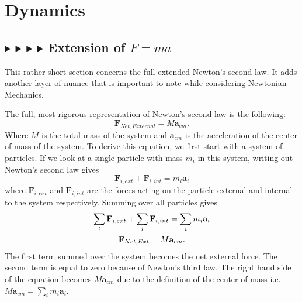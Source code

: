 \clearpage

%
%
%
%

\section{Dynamics}\label{1.2}

%
%
\subsection{\color{OrangeRed} $\blacktriangleright$ \color{PineGreen} $\blacktriangleright$ \color{Goldenrod} $\blacktriangleright$ \color{Orchid} $\blacktriangleright$ \color{black} Extension of $F=ma$}\label{1.2.1}
This rather short section concerns the full extended Newton's second law. It adds another layer of nuance that is important to note while considering Newtonian Mechanics.

\noindent The full, most rigorous representation of Newton's second law is the following:
\begin{equation}
    \boxed{\mathbf{F}_{Net, External} = M\mathbf{a}_{cm}}.
\end{equation}
\noindent Where $M$ is the total mass of the system and $\textbf{a}_{cm}$ is the acceleration of the center of mass of the system. To derive this equation, we first start with a system of particles. If we look at a single particle with mass $m_i$ in this system, writing out Newton's second law gives
\begin{equation}
    \mathbf{F}_{i,ext} + \mathbf{F}_{i,int} = m_i\mathbf{a}_i
\end{equation}
\noindent where $\mathbf{F}_{i,ext}$ and $\mathbf{F}_{i,int}$ are the forces acting on the particle external and internal to the system respectively. Summing over all particles gives
\begin{gather}
    \sum_i \mathbf{F}_{i,ext} + \sum_i \mathbf{F}_{i,int} = \sum_i m_i\mathbf{a}_i \nonumber \\
    \mathbf{F}_{Net,Ext} = M\mathbf{a}_{cm}.
\end{gather}
\noindent The first term summed over the system becomes the net external force. The second term is equal to zero because of Newton's third law. The right hand side of the equation becomes $M\mathbf{a}_{cm}$ due to the definition of the center of mass i.e. $M\mathbf{a}_{cm} = \sum_i m_i\mathbf{a}_i$.

